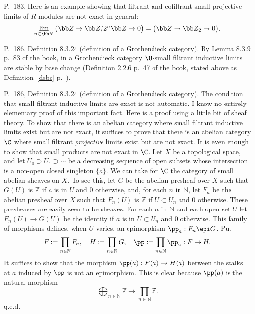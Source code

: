 \documentclass[12pt]{article}
\theoremstyle{remark}
\theoremstyle{definition}
\begin{document}
%

\begin{s} 
P.~183. Here is an example showing that filtrant and cofiltrant small projective limits of $R$-modules are not exact in general: 
$$
\lim_{n\in\bb N}\big(\bb Z\to\bb Z/2^n\bb Z\to0\big)=\big(\bb Z\to\bb Z_2\to0\big).
$$
\end{s}

%

\begin{s}
P.~186, Definition 8.3.24 (definition of a Grothendieck category). By Lemma 8.3.9 p.~83 of the book, in a Grothendieck category $\U$-small filtrant inductive limits are stable by base change (Definition 2.2.6 p.~47 of the book, stated above as Definition~\ref{dsbc} p.~).
\end{s}

%

\begin{s} 
P.~186, Definition 8.3.24 (definition of a Grothendieck category). The condition that small filtrant inductive limits are exact is not automatic. I know no entirely elementary proof of this important fact. Here is a proof using a little bit of sheaf theory. To show that there is an abelian category where small filtrant inductive limits exist but are not exact, it suffices to prove that there is an abelian category $\C$ where small filtrant {\em projective} limits exist but are not exact. It is even enough to show that small products are not exact in $\C$. Let $X$ be a topological space, and let $U_0\supset U_1\supset\cdots$ be a decreasing sequence of open subsets whose intersection is a non-open closed singleton $\{a\}$. We can take for $\C$ the category of small abelian sheaves on $X$. To see this, let $G$ be the abelian presheaf over $X$ such that $G(U)$ is $\mathbb Z$ if $a$ is in $U$ and 0 otherwise, and, for each $n$ in $\mathbb N$, let $F_n$ be the abelian presheaf over $X$ such that $F_n(U)$ is $\mathbb Z$ if $U\subset U_n$ and 0 otherwise. These presheaves are easily seen to be sheaves. For each $n$ in $\mathbb N$ and each open set $U$ let $F_n(U)\to G(U)$ be the identity if $a$ is in $U\subset U_n$ and 0 otherwise. This family of morphisms defines, when $U$ varies, an epimorphism $\pp_n:F_n\epi G$. Put 
$$
F:=\prod_{n\in\mathbb N}F_n,\quad H:=\prod_{n\in\mathbb N}G,\quad\pp:=\prod_{n\in\mathbb N}\pp_n:F\to H.
$$ 
It suffices to show that the morphism $\pp(a):F(a)\to H(a)$ between the stalks at $a$ induced by $\pp$ is not an epimorphism. This is clear because $\pp(a)$ is the natural morphism 
$$
\bigoplus_{n\in\mathbb N}\mathbb Z\to\prod_{n\in\mathbb N}\mathbb Z.
$$
q.e.d.
\end{s}
\end{document}
